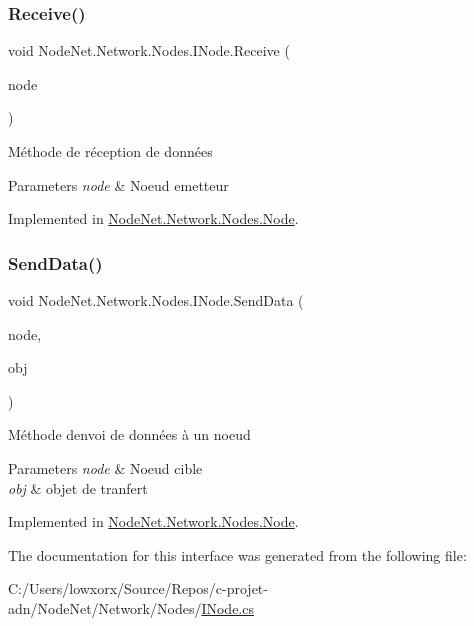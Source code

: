 \subsubsection{\texorpdfstring{Receive()}{Receive()}}
{\footnotesize\ttfamily void Node\+Net.\+Network.\+Nodes.\+I\+Node.\+Receive (\begin{DoxyParamCaption}\item[{\hyperlink{class_node_net_1_1_network_1_1_nodes_1_1_node}{Node}}]{node }\end{DoxyParamCaption})}



Méthode de réception de données 


\begin{DoxyParams}{Parameters}
{\em node} & Noeud emetteur\\
\hline
\end{DoxyParams}


Implemented in \hyperlink{class_node_net_1_1_network_1_1_nodes_1_1_node_abbeae4cb15af4c3a2608f71c317cb701}{Node\+Net.\+Network.\+Nodes.\+Node}.

\mbox{\label{interface_node_net_1_1_network_1_1_nodes_1_1_i_node_ad0fd6197c2be78c4b17d3d02bb9f9a0b}} 
\subsubsection{\texorpdfstring{Send\+Data()}{SendData()}}
{\footnotesize\ttfamily void Node\+Net.\+Network.\+Nodes.\+I\+Node.\+Send\+Data (\begin{DoxyParamCaption}\item[{\hyperlink{class_node_net_1_1_network_1_1_nodes_1_1_node}{Node}}]{node,  }\item[{\hyperlink{class_node_net_1_1_data_1_1_data_input}{Data\+Input}}]{obj }\end{DoxyParamCaption})}



Méthode d\textquotesingle{}envoi de données à un noeud 


\begin{DoxyParams}{Parameters}
{\em node} & Noeud cible\\
\hline
{\em obj} & objet de tranfert\\
\hline
\end{DoxyParams}


Implemented in \hyperlink{class_node_net_1_1_network_1_1_nodes_1_1_node_a208a1c10ae68109762205f3cbcb9665a}{Node\+Net.\+Network.\+Nodes.\+Node}.



The documentation for this interface was generated from the following file\+:\begin{DoxyCompactItemize}
\item 
C\+:/\+Users/lowxorx/\+Source/\+Repos/c-\/projet-\/adn/\+Node\+Net/\+Network/\+Nodes/\hyperlink{_i_node_8cs}{I\+Node.\+cs}\end{DoxyCompactItemize}
